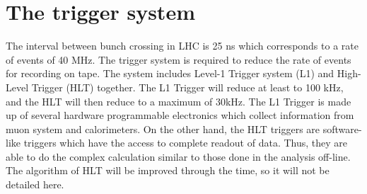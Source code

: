 \section{The trigger system}
The interval between bunch crossing in LHC is 25 ns which corresponds to a rate of events of 40 MHz.
The trigger system is required to reduce the rate of events for recording on tape.
The system includes Level-1 Trigger system (L1) and High-Level Trigger (HLT) together.
The L1 Trigger will reduce at least to 100 kHz, and the HLT will then reduce to a maximum of 30kHz.
The L1 Trigger is made up of several hardware programmable electronics which collect information from muon system and calorimeters.
On the other hand, the HLT triggers are software-like triggers which have the access to complete readout of data. 
Thus, they are able to do the complex calculation similar to those done in the analysis off-line. 
The algorithm of HLT will be improved through the time, so it will not be detailed here.
 